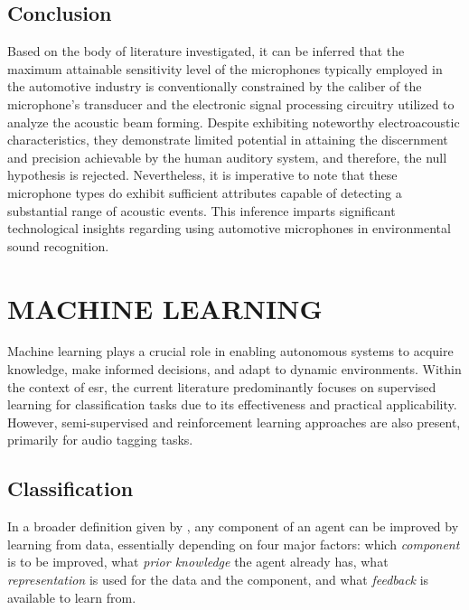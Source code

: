 \subsection{Conclusion}
\label{subsec:microphones_conclusion}

Based on the body of literature investigated, it can be inferred that the maximum attainable sensitivity level of the microphones typically employed in the automotive industry is conventionally constrained by the caliber of the microphone's transducer and the electronic signal processing circuitry utilized to analyze the acoustic beam forming. Despite exhibiting noteworthy electroacoustic characteristics, they demonstrate limited potential in attaining the discernment and precision achievable by the human auditory system, and therefore, the null hypothesis is rejected. Nevertheless, it is imperative to note that these microphone types do exhibit sufficient attributes capable of detecting a substantial range of acoustic events. This inference imparts significant technological insights regarding using automotive microphones in environmental sound recognition.


\section{MACHINE LEARNING}
\label{sec:frmwk_machine_learning}

Machine learning plays a crucial role in enabling autonomous systems to acquire knowledge, make informed decisions, and adapt to dynamic environments. Within the context of \gls{esr}, the current literature predominantly focuses on supervised learning for classification tasks due to its effectiveness and practical applicability. However, semi-supervised and reinforcement learning approaches are also present, primarily for audio tagging tasks. 


\subsection{Classification}
\label{subsec:machine_learning_classification}

In a broader definition given by \textcite{Russel2010}, any component of an agent can be improved by learning from data, essentially depending on four major factors: which \textit{component} is to be improved, what \textit{prior knowledge} the agent already has, what \textit{representation} is used for the data and the component, and what \textit{feedback} is available to learn from.

